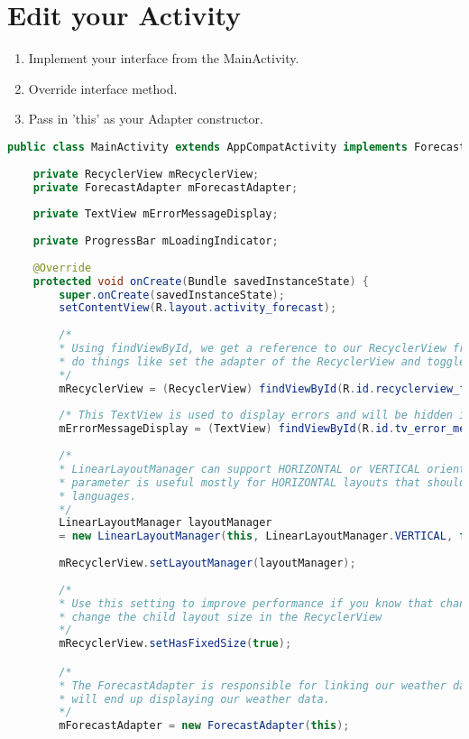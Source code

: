 \documentclass[12pt]{article} %
\begin{document}
\section{Edit your Activity}

\begin{enumerate}
	\item Implement your interface from the MainActivity.
	\item Override interface method.
	\item Pass in 'this' as your Adapter constructor.
\end{enumerate}

\begin{lstlisting}[language=Java]
public class MainActivity extends AppCompatActivity implements ForecastAdapter.ForecastAdapterOnClickHandler{
	
	private RecyclerView mRecyclerView;
	private ForecastAdapter mForecastAdapter;
	
	private TextView mErrorMessageDisplay;
	
	private ProgressBar mLoadingIndicator;
	
	@Override
	protected void onCreate(Bundle savedInstanceState) {
		super.onCreate(savedInstanceState);
		setContentView(R.layout.activity_forecast);
		
		/*
		* Using findViewById, we get a reference to our RecyclerView from xml. This allows us to
		* do things like set the adapter of the RecyclerView and toggle the visibility.
		*/
		mRecyclerView = (RecyclerView) findViewById(R.id.recyclerview_forecast);
		
		/* This TextView is used to display errors and will be hidden if there are no errors */
		mErrorMessageDisplay = (TextView) findViewById(R.id.tv_error_message_display);
		
		/*
		* LinearLayoutManager can support HORIZONTAL or VERTICAL orientations. The reverse layout
		* parameter is useful mostly for HORIZONTAL layouts that should reverse for right to left
		* languages.
		*/
		LinearLayoutManager layoutManager
		= new LinearLayoutManager(this, LinearLayoutManager.VERTICAL, false);
		
		mRecyclerView.setLayoutManager(layoutManager);
		
		/*
		* Use this setting to improve performance if you know that changes in content do not
		* change the child layout size in the RecyclerView
		*/
		mRecyclerView.setHasFixedSize(true);

		/*
		* The ForecastAdapter is responsible for linking our weather data with the Views that
		* will end up displaying our weather data.
		*/
		mForecastAdapter = new ForecastAdapter(this);
		

\end{lstlisting}
\end{document}
